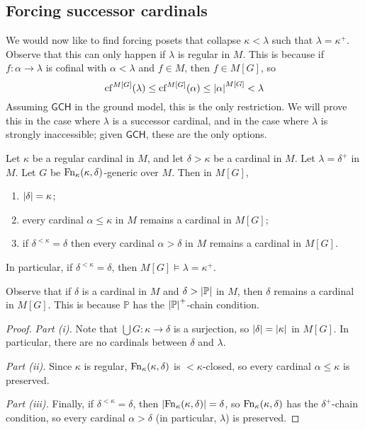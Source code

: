 \subsection{Forcing successor cardinals}
We would now like to find forcing posets that collapse \( \kappa < \lambda \) such that \( \lambda = \kappa^+ \).
Observe that this can only happen if \( \lambda \) is regular in \( M \).
This is because if \( f : \alpha \to \lambda \) is cofinal with \( \alpha < \lambda \) and \( f \in M \), then \( f \in M[G] \), so
\[ \operatorname{cf}^{M[G]}(\lambda) \leq \operatorname{cf}^{M[G]}(\alpha) \leq \abs{\alpha}^{M[G]} < \lambda \]
Assuming \( \mathsf{GCH} \) in the ground model, this is the only restriction.
We will prove this in the case where \( \lambda \) is a successor cardinal, and in the case where \( \lambda \) is strongly inaccessible; given \( \mathsf{GCH} \), these are the only options.
\begin{theorem}
    Let \( \kappa \) be a regular cardinal in \( M \), and let \( \delta > \kappa \) be a cardinal in \( M \).
    Let \( \lambda = \delta^+ \) in \( M \).
    Let \( G \) be \( \operatorname{Fn}_\kappa(\kappa, \delta) \)-generic over \( M \).
    Then in \( M[G] \),
    \begin{enumerate}
        \item \( \abs{\delta} = \kappa \);
        \item every cardinal \( \alpha \leq \kappa \) in \( M \) remains a cardinal in \( M[G] \);
        \item if \( \delta^{<\kappa} = \delta \) then every cardinal \( \alpha > \delta \) in \( M \) remains a cardinal in \( M[G] \).
    \end{enumerate}
    In particular, if \( \delta^{<\kappa} = \delta \), then \( M[G] \vDash \lambda = \kappa^+ \).
\end{theorem}
Observe that if \( \delta \) is a cardinal in \( M \) and \( \delta > \abs{\mathbb P} \) in \( M \), then \( \delta \) remains a cardinal in \( M[G] \).
This is because \( \mathbb P \) has the \( \abs{\mathbb P}^+ \)-chain condition.
\begin{proof}
    \emph{Part (i).}
    Note that \( \bigcup G : \kappa \to \delta \) is a surjection, so \( \abs{\delta} = \abs{\kappa} \) in \( M[G] \).
    In particular, there are no cardinals between \( \delta \) and \( \lambda \).

    \emph{Part (ii).}
    Since \( \kappa \) is regular, \( \operatorname{Fn}_\kappa(\kappa,\delta) \) is \( <\kappa \)-closed, so every cardinal \( \alpha \leq \kappa \) is preserved.

    \emph{Part (iii).}
    Finally, if \( \delta^{<\kappa} = \delta \), then \( \abs{\operatorname{Fn}_\kappa(\kappa,\delta)} = \delta \), so \( \operatorname{Fn}_\kappa(\kappa,\delta) \) has the \( \delta^+ \)-chain condition, so every cardinal \( \alpha > \delta \) (in particular, \( \lambda \)) is preserved.
\end{proof}
